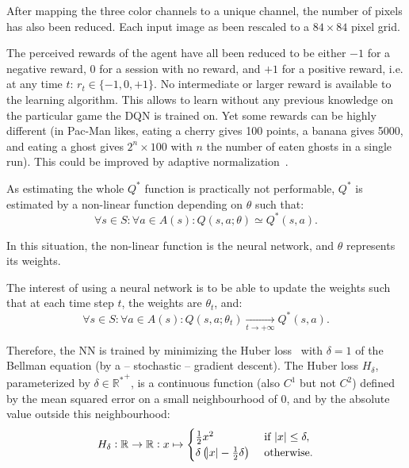 \documentclass[letterpaper]{article}
\begin{document}
After mapping the three color channels to a unique channel, the number of pixels has also been reduced. Each input image as been rescaled to a
$84 \times 84$ pixel grid.

The perceived rewards of the agent have all been reduced to be either $-1$ for a negative reward, $0$ for a session with no reward, and $+1$
for a positive reward, i.e. at any time $t$: $r_t \in \{-1, 0, +1\}$. No intermediate or larger reward is available to the learning algorithm.
This allows to learn without any previous knowledge on the particular game the DQN is trained on. Yet some rewards can be highly different (in Pac-Man likes,
eating a cherry gives 100 points, a banana gives 5000, and eating a ghost gives $2^n \times 100$ with $n$ the number of eaten ghosts in a single run).
This could be improved by adaptive normalization~\citep{van2016learning}.

As estimating the whole $Q^*$ function is practically not performable, $Q^*$ is estimated by a non-linear function depending on $\theta$ such that:
\begin{equation}
	\forall s \in S : \forall a \in A(s) : Q(s, a; \theta) \simeq Q^*(s, a).
\end{equation}

In this situation, the non-linear function is the neural network, and $\theta$ represents its weights.

The interest of using a neural network is to be able to update the weights such that at each time step $t$, the weights are $\theta_t$, and:
\begin{equation}
	\forall s \in S : \forall a \in A(s) : Q(s, a; \theta_t) \xrightarrow[t \to +\infty]{} Q^*(s, a).
\end{equation}

Therefore, the NN is trained by minimizing the Huber loss~\citep{huber1964robust} with $\delta=1$ of the Bellman equation (by a -- stochastic -- gradient descent).
The Huber loss $H_\delta$, parameterized by $\delta \in {\mathbb R^*}^+$, is a continuous function (also $C^1$ but not $C^2$) defined by the mean
squared error on a small neighbourhood of $0$, and by the absolute value outside this neighbourhood:
\begin{equation}
	H_\delta : \mathbb R \to \mathbb R : x \mapsto \begin{cases}\frac 12x^2                                &\text{ if } \abs x \leq \delta,\\
	                                                            \delta\left(\abs x - \frac 12\delta\right) &\text{ otherwise.}\end{cases}
\end{equation}
\end{document}
